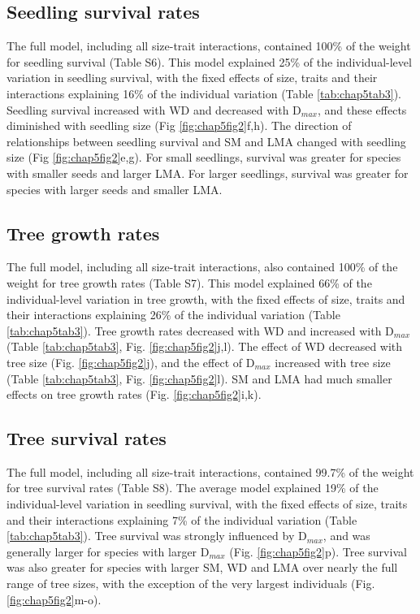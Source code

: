\documentclass[b5paper,justified]{tufte-book} %
\begin{document}
\begin{fullwidth}
\subsection{Seedling survival rates}
The full model, including all size-trait interactions, contained 100\% of the weight for seedling survival (Table S6). This model explained 25\% of the individual-level variation in seedling survival, with the fixed effects of size, traits and their interactions explaining 16\% of the individual variation (Table \ref{tab:chap5tab3}). Seedling survival increased with WD and decreased with D$_{max}$, and these effects diminished with seedling size (Fig \ref{fig:chap5fig2}f,h). The direction of relationships between seedling survival and SM and LMA changed with
seedling size (Fig \ref{fig:chap5fig2}e,g). For small seedlings, survival was greater for species with smaller seeds and larger LMA. For larger seedlings, survival was greater for species with larger seeds and smaller LMA.

\subsection{Tree growth rates} 
The full model, including all size-trait interactions, also contained 100\% of the weight for tree growth rates
(Table S7). This model explained 66\% of the individual-level variation in tree growth, with the fixed effects of size, traits and their interactions explaining 26\% of the individual variation (Table \ref{tab:chap5tab3}). Tree growth rates decreased with WD and increased with D$_{max}$ (Table \ref{tab:chap5tab3}, Fig. \ref{fig:chap5fig2}j,l). The effect of WD decreased with tree size (Fig. \ref{fig:chap5fig2}j), and the effect of D$_{max}$ increased with tree size (Table \ref{tab:chap5tab3}, Fig. \ref{fig:chap5fig2}l). SM and LMA had much smaller effects on tree growth rates (Fig. \ref{fig:chap5fig2}i,k). 



\subsection{Tree survival rates}
The full model, including all size-trait interactions, contained 99.7\% of the weight for tree survival rates
(Table S8). The average model explained 19\% of the individual-level variation in seedling survival, with the fixed
effects of size, traits and their interactions explaining 7\% of the individual variation (Table \ref{tab:chap5tab3}). Tree survival was strongly influenced by D$_{max}$, and was generally larger for species with larger D$_{max}$ (Fig. \ref{fig:chap5fig2}p). Tree survival was also greater for species with larger SM, WD and LMA over nearly the full range of tree sizes, with the exception of the very largest individuals (Fig. \ref{fig:chap5fig2}m-o).


\end{fullwidth}
\end{document}
